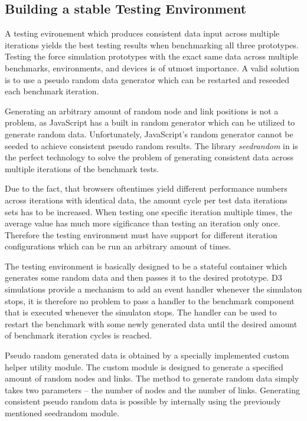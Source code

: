 \subsection{Building a stable Testing Environment}
\label{sub:perfImplDetails}

A testing evironement which produces consistent data input across multiple iterations yields the best testing results when benchmarking all three prototypes. Testing the force simulation prototypes with the exact same data across multiple benchmarks, environments, and devices is of utmost importance. A valid solution is to use a pseudo random data generator which can be restarted and reseeded each benchmark iteration.

Generating an arbitrary amount of random node and link positions is not a problem, as JavaScript has a built in random generator which can be utilized to generate random data. Unfortunately, JavaScript's random generator cannot be seeded to achieve consistent pseudo random results. The library \emph{seedrandom} in \cite{SeedRandom} is the perfect technology to solve the problem of generating consistent data across multiple iterations of the benchmark tests.

Due to the fact, that browsers oftentimes yield different performance numbers across iterations with identical data, the amount cycle per test data iterations sets has to be increased. When testing one specific iteration multiple times, the average value has much more sigificance than testing an iteration only once. Therefore the testing environment must have support for different iteration configurations which can be run an arbitrary amount of times.

The testing environment is basically designed to be a stateful container which generates some random data and then passes it to the desired prototype. D3 simulations provide a mechanism to add an event handler whenever the simulaton stops, it is therefore no problem to pass a handler to the benchmark component that is executed whenever the simulaton stops. The handler can be used to restart the benchmark with some newly generated data until the desired amount of benchmark iteration cycles is reached.

Pseudo random generated data is obtained by a specially implemented custom helper utility module. The custom module is designed to generate a specified amount of random nodes and links. The method to generate random data simply takes two parameters -- the number of nodes and the number of links. Generating consistent pseudo random data is possible by internally using the previously mentioned seedrandom module.

